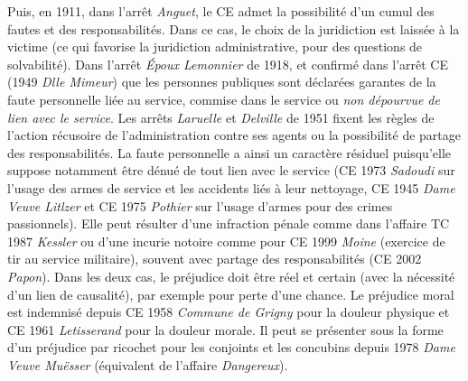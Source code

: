 \documentclass[math]{cours}
\begin{document}
Puis, en 1911, dans l'arrêt \emph{Anguet}, le CE admet la possibilité d'un cumul des fautes et des responsabilités. Dans ce cas, le choix de la juridiction est laissée à la victime (ce qui favorise la juridiction administrative, pour des questions de solvabilité).
Dans l'arrêt \emph{Époux Lemonnier} de 1918, et confirmé dans l'arrêt CE (1949 \emph{Dlle Mimeur}) que les personnes publiques sont déclarées garantes de la faute personnelle liée au service, commise dans le service ou \emph{non dépourvue de lien avec le service}.
Les arrêts \emph{Laruelle} et \emph{Delville} de 1951 fixent les règles de l'action récusoire de l'administration contre ses agents ou la possibilité de partage des responsabilités.
La faute personnelle a ainsi un caractère résiduel puisqu'elle suppose notamment être dénué de tout lien avec le service (CE 1973 \emph{Sadoudi} sur l'usage des armes de service et les accidents liés à leur nettoyage, CE 1945 \emph{Dame Veuve Litlzer} et CE 1975 \emph{Pothier} sur l'usage d'armes pour des crimes passionnels).
Elle peut résulter d'une infraction pénale comme dans l'affaire TC 1987 \emph{Kessler} ou d'une incurie notoire comme pour CE 1999 \emph{Moine} (exercice de tir au service militaire), souvent avec partage des responsabilités (CE 2002 \emph{Papon}).
Dans les deux cas, le préjudice doit être réel et certain (avec la nécessité d'un lien de causalité), par exemple pour perte d'une chance.
Le préjudice moral est indemnisé depuis CE 1958 \emph{Commune de Grigny} pour la douleur physique et CE 1961 \emph{Letisserand} pour la douleur morale.
Il peut se présenter sous la forme d'un préjudice par ricochet pour les conjoints et les concubins depuis 1978 \emph{Dame Veuve Muësser} (équivalent de l'affaire \emph{Dangereux}).
\end{document}
